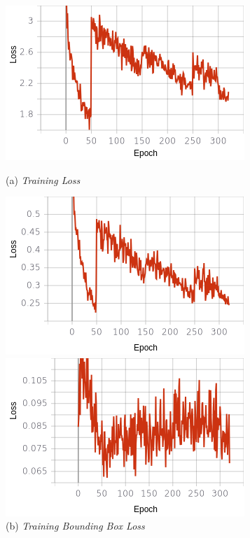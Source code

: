\begin{figure}[H]
	\centering
	\begin{minipage}{0.45\textwidth}
		\includegraphics[width=\textwidth]{gambar/training_resnet50/tugas-akhir-Page 18.png}
		\caption*{(a) \textit{Training Loss}}
	\end{minipage}
	\hfill
	\begin{minipage}{0.45\textwidth}
		\includegraphics[width=\textwidth]{gambar/training_resnet50/tugas-akhir-Page 18 (1).png}
		\caption*{(b) \textit{Training Bounding Box Loss}}
	\end{minipage}
	\vfill
	\begin{minipage}{0.45\textwidth}
		\includegraphics[width=\textwidth]{gambar/training_resnet50/tugas-akhir-Page 18 (2).png}

\end{minipage}
\end{figure}
